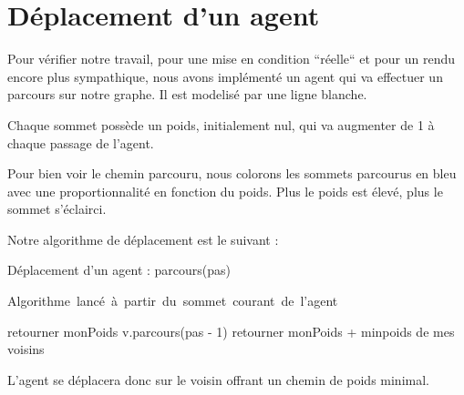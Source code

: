 \documentclass[a4paper,12pt]{report}
\begin{document}
\section{Déplacement d'un agent}

Pour vérifier notre travail, pour une mise en condition ``réelle`` et pour un rendu encore plus sympathique, nous avons implémenté un agent qui va effectuer un parcours sur notre graphe. Il est modelisé par une ligne blanche.

Chaque sommet possède un poids, initialement nul, qui va augmenter de 1 à chaque passage de l'agent.

Pour bien voir le chemin parcouru, nous colorons les sommets parcourus en bleu avec une proportionnalité en fonction du poids. Plus le poids est élevé, plus le sommet s'éclairci.

Notre algorithme de déplacement est le suivant : 

\begin{algorithm}[h]
\caption{Déplacement d'un agent : parcours(pas)}
\label{merging_graphe}
\mbox{Algorithme lancé à partir du sommet courant de l'agent}
\begin{algorithmic}[1]
  \STATE retourner monPoids
\ELSE
      \STATE v.parcours(pas - 1)
  \ENDFOR
  \STATE retourner monPoids + min{poids de mes voisins}
\ENDIF
\end{algorithmic}
\end{algorithm}

L'agent se déplacera donc sur le voisin offrant un chemin de poids minimal.
\end{document}
